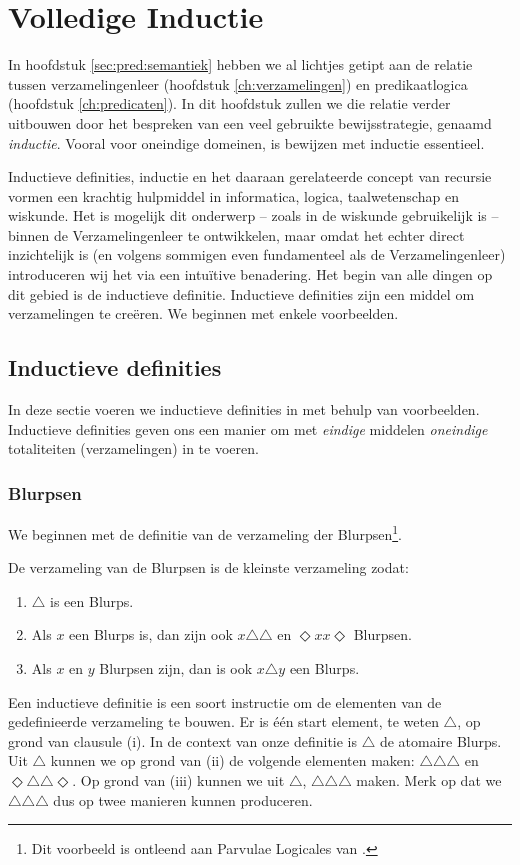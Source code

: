 \chapter{Volledige Inductie}\label{ch:inductie}

In hoofdstuk \ref{sec:pred:semantiek} hebben we al lichtjes getipt aan de relatie tussen verzamelingenleer (hoofdstuk \ref{ch:verzamelingen}) en predikaatlogica (hoofdstuk \ref{ch:predicaten}). In dit hoofdstuk zullen we die relatie verder uitbouwen door het bespreken van een veel gebruikte bewijsstrategie, genaamd \textit{inductie}. Vooral voor oneindige domeinen, is bewijzen met inductie essentieel.

Inductieve definities, inductie en het daaraan gerelateerde concept van recursie vormen een krachtig hulpmiddel in informatica, logica, taalwetenschap en wiskunde. Het is mogelijk dit onderwerp -- zoals in de wiskunde gebruikelijk is -- binnen de Verzamelingenleer te ontwikkelen, maar omdat het echter direct inzichtelijk is (en volgens sommigen even fundamenteel als de Verzamelingenleer) introduceren wij het via een intu\"itive benadering. Het begin van alle dingen op dit gebied is de inductieve definitie. Inductieve definities zijn een middel om verzamelingen te cre\"eren. We beginnen met enkele voorbeelden.

\section{Inductieve definities}
In deze sectie voeren we inductieve definities in met behulp van voorbeelden. Inductieve definities geven ons een manier om met \textit{eindige} middelen \textit{oneindige} totaliteiten (verzamelingen) in te voeren.

\subsection*{Blurpsen}
We beginnen met de definitie van de verzameling der Blurpsen\footnote{Dit voorbeeld is ontleend aan Parvulae Logicales van \cite{parvulae}.}.
\begin{definition}
De verzameling van de Blurpsen is de kleinste verzameling zodat:
\begin{enumerate}[label=\roman*.]
    \item $\triangle$ is een Blurps.
    \item Als $x$ een Blurps is, dan zijn ook $x\triangle\triangle$ en $\Diamond xx\Diamond$ Blurpsen.
    \item Als $x$ en $y$ Blurpsen zijn, dan is ook $x\triangle y$ een Blurps.
\end{enumerate}
\end{definition}
Een inductieve definitie is een soort instructie om de elementen van de gedefinieerde verzameling te bouwen. Er is \'e\'en start element, te weten $\triangle$, op grond van clausule (i). In de context van onze definitie is $\triangle$ de atomaire Blurps. Uit $\triangle$ kunnen we op grond van (ii) de volgende elementen maken: $\triangle\triangle\triangle$ en $\Diamond\triangle\triangle\Diamond$. Op grond van (iii) kunnen we uit $\triangle$, $\triangle\triangle\triangle$ maken. Merk op dat we $\triangle\triangle\triangle$ dus op twee manieren kunnen produceren.

